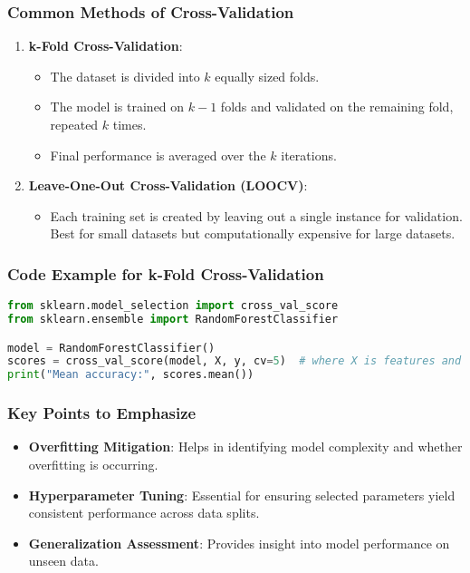 \documentclass[aspectratio=169]{beamer}
\begin{document}
\begin{frame}[fragile]
    \frametitle{Common Methods of Cross-Validation}
    \begin{enumerate}
        \item \textbf{k-Fold Cross-Validation}:
            \begin{itemize}
                \item The dataset is divided into $k$ equally sized folds.
                \item The model is trained on $k-1$ folds and validated on the remaining fold, repeated $k$ times.
                \item Final performance is averaged over the $k$ iterations.
            \end{itemize}
        \item \textbf{Leave-One-Out Cross-Validation (LOOCV)}:
            \begin{itemize}
                \item Each training set is created by leaving out a single instance for validation. Best for small datasets but computationally expensive for large datasets.
            \end{itemize}
    \end{enumerate}
\end{frame}

\begin{frame}[fragile]
    \frametitle{Code Example for k-Fold Cross-Validation}
    \begin{lstlisting}[language=Python]
from sklearn.model_selection import cross_val_score
from sklearn.ensemble import RandomForestClassifier

model = RandomForestClassifier()
scores = cross_val_score(model, X, y, cv=5)  # where X is features and y is labels
print("Mean accuracy:", scores.mean())
    \end{lstlisting}
\end{frame}

\begin{frame}[fragile]
    \frametitle{Key Points to Emphasize}
    \begin{itemize}
        \item \textbf{Overfitting Mitigation}: Helps in identifying model complexity and whether overfitting is occurring.
        \item \textbf{Hyperparameter Tuning}: Essential for ensuring selected parameters yield consistent performance across data splits.
        \item \textbf{Generalization Assessment}: Provides insight into model performance on unseen data.
    \end{itemize}
\end{frame}
\end{document}
